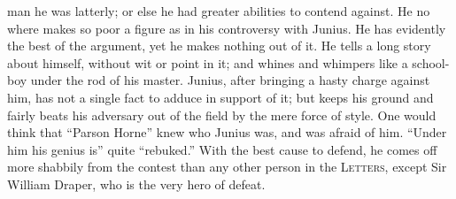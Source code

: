 man he was latterly; or else he had greater abilities to contend
against. He no where makes so poor a figure as in his controversy
with Junius. He has evidently the best of the argument, yet he
makes nothing out of it. He tells a long story about himself,
without wit or point in it; and whines and whimpers like a
school-boy under the rod of his master. Junius, after bringing a
hasty charge against him, has not a single fact to adduce in
support of it; but keeps his ground and fairly beats his adversary
out of the field by the mere force of style. One would think that
``Parson Horne'' knew who Junius was, and was afraid of him. ``Under
him his genius is'' quite ``rebuked.'' With the best cause to defend,
he comes off more shabbily from the contest than any other person
in the \textsc{Letters}, except Sir William Draper, who is the very hero of
defeat.

